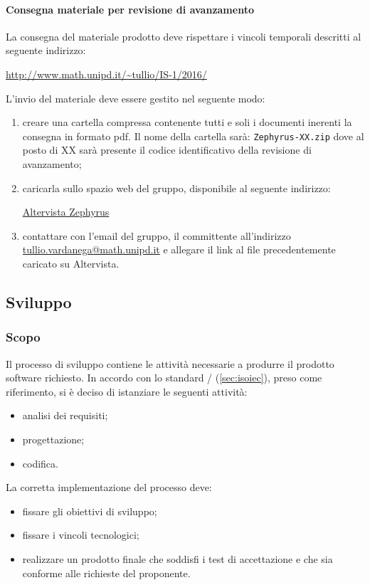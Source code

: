 			\paragraph{Consegna materiale per revisione di avanzamento}
			La consegna del materiale prodotto deve rispettare i vincoli temporali descritti al seguente indirizzo:
			\begin{center}
				\url{http://www.math.unipd.it/~tullio/IS-1/2016/}
			\end{center}
			L'invio del materiale deve essere gestito nel seguente modo:
			\begin{enumerate}
				\item creare una cartella compressa contenente tutti e soli i documenti inerenti la consegna in formato pdf. Il nome della cartella sarà: \texttt{Zephyrus-XX.zip} dove al posto di XX sarà presente il codice identificativo della revisione di avanzamento;
				\item caricarla sullo spazio web del gruppo, disponibile al seguente indirizzo:
				\begin{center}
					\href{http://zephyrusar.altervista.org/}{Altervista Zephyrus}
				\end{center}
			\item contattare con l'email del gruppo, il committente all'indirizzo \url{tullio.vardanega@math.unipd.it} e allegare il link al file precedentemente caricato su Altervista.
			\end{enumerate}
    \subsection{Sviluppo}
        \subsubsection{Scopo}
	        Il processo di sviluppo contiene le attività necessarie a produrre il prodotto software richiesto. In accordo con lo standard / (\ref{sec:isoiec}), preso come riferimento, si è deciso di istanziare le seguenti attività:
        \begin{itemize}
            \item analisi dei requisiti;
            \item progettazione;
            \item codifica.
        \end{itemize}
        La corretta implementazione del processo deve:
        \begin{itemize}
            \item fissare gli obiettivi di sviluppo;
            \item fissare i vincoli tecnologici;
            \item realizzare un prodotto finale che soddisfi i test di accettazione e che sia conforme alle richieste del proponente.
        \end{itemize}
